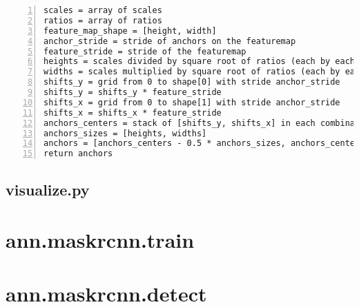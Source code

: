 {\scriptsize
\begin{lstlisting}[style=python, caption={generate\_anchors}, captionpos=b, label=code:anchors, deletekeywords={range, from, map, in},
backgroundcolor = \color{light-gray}, numbers=left, breaklines=true]
scales = array of scales
ratios = array of ratios
feature_map_shape = [height, width]
anchor_stride = stride of anchors on the featuremap
feature_stride = stride of the featuremap
heights = scales divided by square root of ratios (each by each)
widths = scales multiplied by square root of ratios (each by each)
shifts_y = grid from 0 to shape[0] with stride anchor_stride
shifts_y = shifts_y * feature_stride
shifts_x = grid from 0 to shape[1] with stride anchor_stride
shifts_x = shifts_x * feature_stride
anchors_centers = stack of [shifts_y, shifts_x] in each combination
anchors_sizes = [heights, widths]
anchors = [anchors_centers - 0.5 * anchors_sizes, anchors_centers + 0.5 * anchors_sizes]
return anchors
\end{lstlisting}}

\subsection{visualize.py}
\label{visualize}



\section{ann.maskrcnn.train}
\label{train-module}

\section{ann.maskrcnn.detect}
\label{detect-module}
